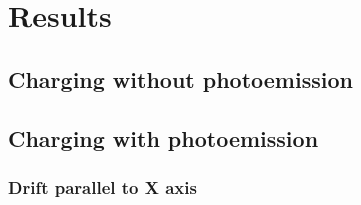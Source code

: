 \chapter{Results}
\label{sec:results}

\section{Charging without photoemission}


\section{Charging with photoemission}

\subsection*{Drift parallel to X axis}

